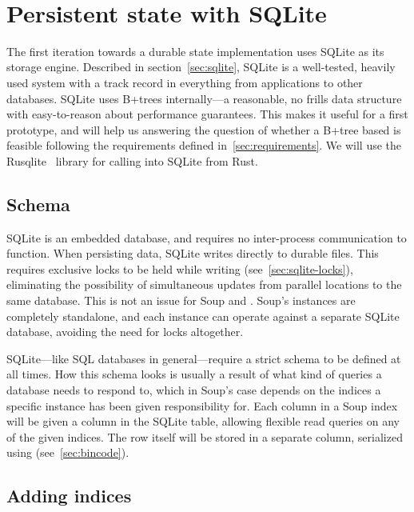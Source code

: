  \\

\section{Persistent state with SQLite}
The first iteration towards a durable state implementation uses SQLite as its
storage engine. Described in section~\ref{sec:sqlite}, SQLite is a well-tested,
heavily used system with a track record in everything from applications to other
databases. SQLite uses B+trees internally---a reasonable, no frills data
structure with easy-to-reason about performance guarantees. This makes it useful
for a first prototype, and will help us answering the question of whether a
B+tree based  is feasible following the requirements
defined in~\ref{sec:requirements}. We will use the Rusqlite~\cite{rusqlite}
library for calling into SQLite from Rust.

\subsection{Schema}

SQLite is an embedded database, and requires no inter-process communication to
function. When persisting data, SQLite writes directly to durable files. This
requires exclusive locks to be held while writing (see~\ref{sec:sqlite-locks}),
eliminating the possibility of simultaneous updates from parallel locations to
the same database. This is not an issue for Soup and .
Soup's  instances are completely standalone, and each
 instance can operate against a separate SQLite database,
avoiding the need for locks altogether.

SQLite---like SQL databases in general---require a strict schema to be defined
at all times. How this schema looks is usually a result of what kind of queries
a database needs to respond to, which in Soup's case depends on the indices a
specific  instance has been given responsibility for. Each column in
a Soup index will be given a column in the SQLite table, allowing flexible read
queries on any of the given indices. The row itself will be stored in a separate
column, serialized using  (see~\ref{sec:bincode}).

\subsection{Adding indices}

